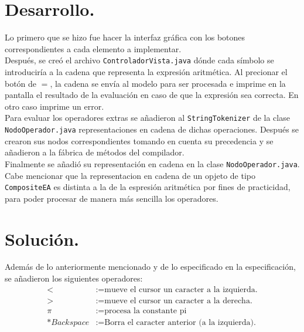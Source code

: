 \documentclass[a4paper,12pt]{report}
\begin{document}
\section*{Desarrollo.}{
    Lo primero que se hizo fue hacer la interfaz gráfica con los botones
    correspondientes a cada elemento a implementar.\\
    Después, se creó el archivo \texttt{ControladorVista.java} dónde cada
    símbolo se introduciría a la cadena que representa la expresión aritmética.
    Al precionar el botón de $=$, la cadena se envía al modelo para ser
    procesada e imprime en la pantalla el resultado de la evaluación en caso de
    que la expresión sea correcta. En otro caso imprime un error.\\
    Para evaluar los operadores extras se añadieron al \texttt{StringTokenizer}
    de la clase \texttt{NodoOperador.java} representaciones en cadena de dichas
    operaciones. Después se crearon sus nodos correspondientes tomando en cuenta
    su precedencia y se añadieron a la fábrica de métodos del compilador.\\
    Finalmente se añadió su representación en cadena en la clase
    \texttt{NodoOperador.java}. Cabe mencionar que la representacion en cadena
    de un opjeto de tipo \texttt{CompositeEA} es distinta a la de la espresión
    aritmética por fines de practicidad, para poder procesar de manera más
    sencilla los operadores.
}
\section*{Solución.}{
    Además de lo anteriormente mencionado y de lo especificado en la
    especificación, se añadieron los siguientes operadores:
    \begin{align*}
        < &:= \text{mueve el cursor un caracter a la izquierda.}\\
        > &:= \text{mueve el cursor un caracter a la derecha.}\\
        \pi &:= \text{procesa la constante pi}\\
        *Backspace &:= \text{Borra el caracter anterior (a la izquierda).}
    \end{align*}
}

\begin{thebibliography}{}
\end{thebibliography}
\end{document}
